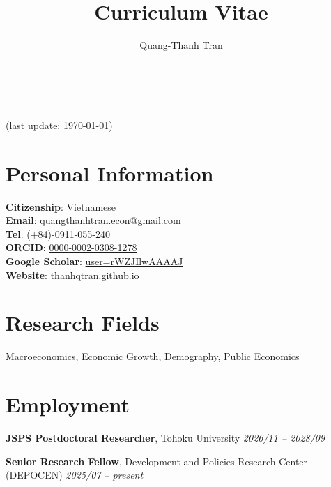 \documentclass[12pt]{article}
\title{Curriculum Vitae} %
\author{Quang-Thanh Tran}
\newcommand{\cvcolor}{\color{DodgerBlue4}} %
\renewcommand{\maketitle}{
\begin{center}
{\Huge\theauthor}\\
\vspace{0.5em}
{\Large \cvcolor{Curriculum Vitae}}\\
{\color{Gray}(last update: \today)}
\end{center}
}
\begin{document}
\sloppy



\maketitle


\section{Personal Information}
\textbf{Citizenship}: Vietnamese \\
\textbf{Email}: \href{mailto:quangthanhtran.econ@gmail.com}{quangthanhtran.econ@gmail.com} \\
\textbf{Tel}: (+84)-0911-055-240 \\
\textbf{ORCID}: \href{https://orcid.org/0000-0002-0308-1278}{0000-0002-0308-1278} \\
\textbf{Google Scholar}: \href{https://scholar.google.com/citations?user=rWZJIlwAAAAJ&hl=en}{user=rWZJIlwAAAAJ} \\
\textbf{Website}: \href{https://thanhqtran.github.io}{thanhqtran.github.io}


\section{Research Fields}
Macroeconomics, Economic Growth, Demography, Public Economics


\section{Employment}

\textbf{JSPS Postdoctoral Researcher}, Tohoku University \hfill \emph{2026/11 -- 2028/09}


\textbf{Senior Research Fellow}, Development and Policies Research Center (DEPOCEN) %
 \hfill \emph{2025/07 -- present} %
\end{document}
